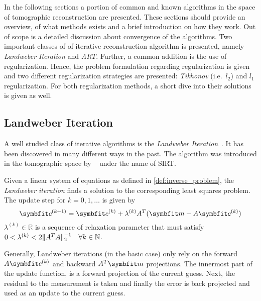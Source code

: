 In the following sections a portion of common and known algorithms in the space of tomographic
reconstruction are presented. These sections should provide an overview, of what methods exists and
a brief introduction on how they work. Out of scope is a detailed discussion about convergence of
the algorithms. Two important classes of of iterative reconstruction algorithm is presented, namely
\textit{Landweber Iteration} and \textit{\gls{ART}}. Further, a common addition is the use of regularization.
Hence, the problem formulation regarding regularization is given and two different regularization
strategies are presented: \textit{Tikhonov} (i.e.\ \(l_2\)) and \(l_1\) regularization. For both
regularization methods, a short dive into their solutions is given as well.

\subsection{Landweber Iteration}\label{subsec:landweber_iteration}

A well studied class of iterative algorithms is the \textit{Landweber
	Iteration}~\cite{landweber_iteration_1951}. It has been discovered in many different ways in
the past. The algorithm was introduced in the tomographic space by
\citeauthor{gilbert_iterative_1972}~\cite{gilbert_iterative_1972} under the name of
\gls{SIRT}.

\begin{definition}\label{def:landweber_iteration}
	Given a linear system of equations as defined in \autoref{def:inverse_problem}, the
	\textit{Landweber iteration} finds a solution to the corresponding least squares problem. The update
	step for \(k = 0, 1, \dots\) is given by
	\[
		\mvec{c}^{(k+1)} = \mvec{c}^{(k)} + \lambda^{(k)} A^T(\mvec{m} - A\mvec{c}^{(k)})
	\]
	\(\lambda^{(k)} \in \mathbb{R}\) is a sequence of relaxation parameter that must satisfy
	\(0 < \lambda^{(k)} < 2 \norm{A^T A}_2^{-1}\quad \forall k \in \mathbb{N}\).
\end{definition}

Generally, Landweber iterations (in the basic case) only rely on the forward \(A\mvec{c}^{(k)}\) and backward
\(A^T \mvec{m}\) projections. The innermost part of the update function, is a forward projection of the
current guess. Next, the residual to the measurement is taken and finally the error is back
projected and used as an update to the current guess.

